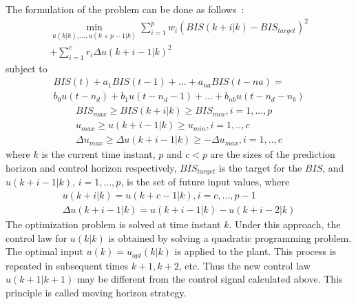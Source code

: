 The formulation of the problem can be done as follows~\cite{Bordons}:
\begin{multline}
\min\limits_{u(k|k),...,u(k+p-1|k)} \sum_{i=1}^{p} w_{i}(BIS(k+i|k)-BIS_{\textit{target}})^2 \\
+ \sum_{i=1}^{c}r_{i}\Delta u (k+i-1|k)^2
\end{multline}
subject to %
\begin{multline}
BIS(t)+a_{1}BIS(t-1)+...+a_{na}BIS(t-na) = \\
 b_{0}u(t-n_{d})+b_{1}u(t-n_{d}-1)+...+b_{nb}u(t-n_{d}-n_{b})
\end{multline}
\begin{multline}
BIS_{max} \ge BIS(k+i|k) \ge BIS_{min}, i=1,...,p \\
u_{max} \ge u(k+i-1|k) \ge u_{min}, i=1,..,c \\
\Delta u_{max} \ge \Delta u(k+i-1|k) \ge -\Delta u_{max}, i=1,..,c
\end{multline}
\noindent
where $k$ is the current time instant, $p$ and $c<p$ are the sizes of
the prediction horizon and control horizon respectively,
$BIS_{target}$ is the target for the $BIS$, and $u(k+i-1|k)$,
$i=1,...,p$, is the set of future input values, where
\begin{multline}
u(k+i|k)=u(k+c-1|k), i=c,...,p-1 \\
\Delta u(k+i-1|k)=u(k+i-1|k)-u(k+i-2|k)
\end{multline}
The optimization problem is solved at time instant $k$. Under this
approach, the control law for $u(k|k)$ is obtained by solving a
quadratic programming problem. The optimal input $u(k)=u_{opt}(k|k)$
is applied to the plant. This process is repeated in subsequent times
$k+1, k+2$, etc.  Thus the new control law $u(k +1|k +1)$ may be
different from the control signal calculated above. This principle is
called moving horizon strategy.
